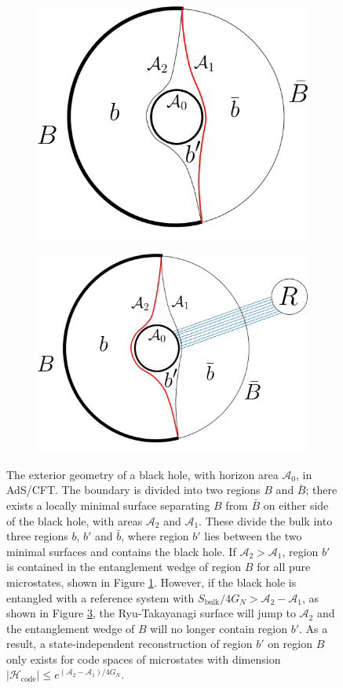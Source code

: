 \documentclass[11pt,a4paper]{article}
\begin{document}
\begin{figure}[t]
\begin{subfigure}{.48\textwidth}
\includegraphics[width = 0.8\linewidth]{BHEntanglementWedge.png}
\centering
\caption{}
\label{fig:BHent}
\end{subfigure}
\begin{subfigure}{.48\textwidth}
\includegraphics[width = 0.95\linewidth]{BH+REntanglementWedge.png}
\centering
\caption{}
\label{fig:BHRent}
\end{subfigure}
\caption{The exterior geometry of a black hole, with horizon area $\mathcal{A}_0$, in AdS/CFT. The boundary is divided into two regions $B$ and $\bar B$; there exists a locally minimal surface separating $B$ from $\bar{B}$ on either side of the black hole, with areas $\mathcal{A}_2$ and $\mathcal{A}_1$. These divide the bulk into three regions $b$, $b'$ and $\bar{b}$, where region $b'$ lies between the two minimal surfaces and contains the black hole. If $\mathcal{A}_2 > \mathcal{A}_1$, region $b'$ is contained in the entanglement wedge of region $B$ for all pure microstates, shown in Figure \ref{fig:BHent}. However, if the black hole is entangled with a reference system with $S_\text{bulk} / 4G_N> \mathcal{A}_2 - \mathcal{A}_1$, as shown in Figure \ref{fig:BHRent}, the Ryu-Takayanagi surface will jump to $\mathcal{A}_2$ and the entanglement wedge of $B$ will no longer contain region $b'$. As a result, a state-independent reconstruction of region $b'$ on region $B$ only exists for code spaces of microstates with dimension $|\mathcal{H}_\text{code}| \leq e^{(\mathcal{A}_2 -\mathcal{A}_1)/4G_N}$. }

\end{figure}
\end{document}
